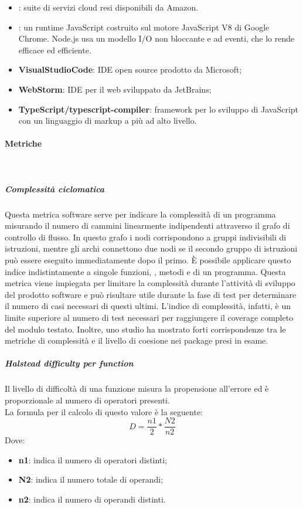 \documentclass[../NormeDiProgetto_v4.0.0.tex]{subfiles}
\begin{document}
\begin{itemize}
				\item \textbf{}: suite di servizi cloud resi disponibili da Amazon.
				
				\item \textbf{}: un runtime JavaScript costruito sul motore JavaScript V8 di Google Chrome. Node.js usa un modello I/O non bloccante e ad eventi, che lo rende efficace ed efficiente.
			
				\item \textbf{VisualStudioCode}: IDE open source prodotto da Microsoft;

				\item \textbf{WebStorm}: IDE per il web sviluppato da JetBrains;

				\item \textbf{TypeScript/typescript-compiler}: framework per lo sviluppo di JavaScript con un linguaggio di markup a più ad alto livello.
			\end{itemize}

			\paragraph{Metriche}\mbox{}\\
			\subparagraph{Complessità ciclomatica}
			Questa metrica software serve per indicare la complessità di un programma misurando il numero di cammini linearmente indipendenti attraverso il grafo di controllo di flusso. In questo grafo i nodi corrispondono a gruppi indivisibili di istruzioni, mentre gli archi connettono due nodi se il secondo gruppo di istruzioni può essere eseguito immediatamente dopo il primo. È possibile applicare questo indice indistintamente a singole funzioni, , metodi e  di un programma. Questa metrica viene impiegata per limitare la complessità durante l'attività di sviluppo del prodotto software e può risultare utile durante la fase di test per determinare il numero di casi necessari di questi ultimi. L'indice di complessità, infatti, è un limite superiore al numero di test necessari per raggiungere il coverage completo del modulo testato. Inoltre, uno studio ha mostrato forti corrispondenze tra le metriche di complessità e il livello di coesione nei package presi in esame.\\
			
			\subparagraph{Halstead difficulty per function}
				Il livello di difficoltà di una funzione misura la propensione all'errore ed è proporzionale al numero di operatori presenti.\\
				La formula per il calcolo di questo valore è la seguente:
				\begin{equation*}
					D = \frac{n1}{2} * \frac{N2}{n2}
				\end{equation*}
				Dove:
				\begin{itemize}
					\item \textbf{n1}: indica il numero di operatori distinti;
					\item \textbf{N2}: indica il numero totale di operandi;
					\item \textbf{n2}: indica il numero di operandi distinti.
				\end{itemize}
\end{document}
